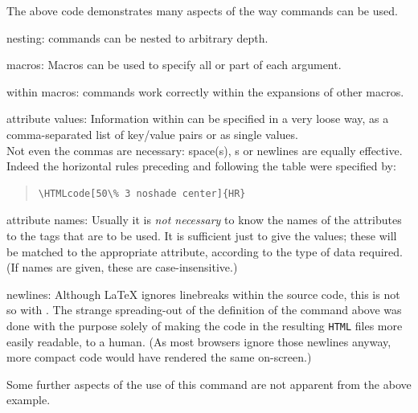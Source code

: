 \noindent
The above code demonstrates many aspects of the way 
commands can be used.
%
\begin{htmllist}
\item [nesting: ] 
 commands can be nested to arbitrary depth.
%
\item [macros: ] 
Macros can be used to specify all or part of each argument.
%
\item [within macros: ] 
 commands work correctly within the expansions of other macros.
%
\item [attribute values: ]
Information within  can be specified in a very
loose way, as a comma-separated list of key/value pairs
or as single values. \\
Not even the commas are necessary: space(s), s 
or newlines are equally effective.
Indeed the horizontal rules preceding and following the table were 
specified by:
\begin{quote}
\begin{verbatim}
\HTMLcode[50\% 3 noshade center]{HR}
\end{verbatim}
\end{quote}
%
\item [attribute names: ]
Usually it is \emph{not necessary} to know the names of the
attributes to the tags that are to be used. It is sufficient
just to give the values; these will be matched to the
appropriate attribute, according to the type of data required.
(If names are given, these are case-insensitive.)
%
\item [newlines: ] 
Although \LaTeX{} ignores linebreaks within the source code,
this is not so with \latextohtml. 
The strange spreading-out of the definition of the
 command above was done with the purpose
solely of making the code in the resulting \texttt{HTML} files 
more easily readable, to a human.
(As most browsers ignore those newlines anyway, 
more compact code would have rendered the same on-screen.)
\end{htmllist}

\medskip\noindent
Some further aspects of the use of this 
command are not apparent from the above example. 

